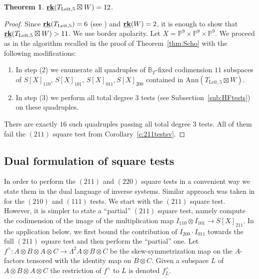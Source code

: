 \documentclass[12pt]{amsart}
\newtheorem{theorem}{Theorem}[section]
\theoremstyle{definition}
\theoremstyle{remark}
\theoremstyle{definition}
\newcommand{\brk}{{\underline{{\bf rk}}}}
\newcommand{\PP}{\mathbb{P}}
\newcommand{\Ann}{\mathrm{Ann}}
\begin{document}
\begin{theorem}\label{thm:leit}
$\brk(T_{\mathrm{Leit},{5}}\boxtimes W) = 12$.
\end{theorem}
\begin{proof}
    Since $\brk(T_{\mathrm{Leit},{5}})= 6$ (see \cite[Proposition~5.1]{LM17}) and $\brk(W) = 2$, it is enough to show that $\brk(T_{\mathrm{Leit},{5}}\boxtimes W) > 11$.
    We use border apolarity. Let $X = \PP^9\times \PP^9\times \PP^9$. 
    We proceed as in the algorithm recalled in the proof of Theorem~\ref{thm:Scho} with the following modifications:
    \begin{enumerate}
    \item In step (2) we enumerate all quadruples of $\mathbb{B}_T$-fixed codimension $11$ subspaces of $S[X]_{110}$, $S[X]_{101}$, $S[X]_{011}, S[X]_{200}$ contained in $\Ann(T_{\mathrm{Leit},{5}}\boxtimes W)$.
    \item In step (3) we perform all total degree $3$ tests (see Subsection~\ref{sub:HFtests}) on these quadruples.
    \end{enumerate}
There are exactly $16$ such quadruples passing all total degree $3$ tests. All of them fail the $(211)$ square test from Corollary~\ref{c:211testsv}.
\end{proof}


\subsection{Dual formulation of square tests}


In order to perform the $(211)$ and $(220)$ square tests in a convenient way we state them in the dual language of inverse systems. Similar approach was taken in \cite[Proposition~3.5]{chl19} for the $(210)$ and $(111)$ tests. We start with the $(211)$ square test. However, it is simpler to state a ``partial'' $(211)$ square test, namely compute the codimension of the image of the multiplication map $I_{110}\otimes I_{101} \to S[X]_{211}$. In the application below, we first bound the contribution of $I_{200}\cdot I_{011}$ towards the full $(211)$ square test and then perform the ``partial'' one.
Let $f^\wedge\colon A\otimes B\otimes A\otimes C \to \Lambda^2 A\otimes B\otimes C$ be the skew-symmetrization map on the $A$-factors tensored with the identity map on $B\otimes C$. 
Given a subspace $L$ of $A\otimes B\otimes A\otimes C$ the restriction of $f^\wedge$ to $L$ is denoted $f^\wedge_L$.
\end{document}
